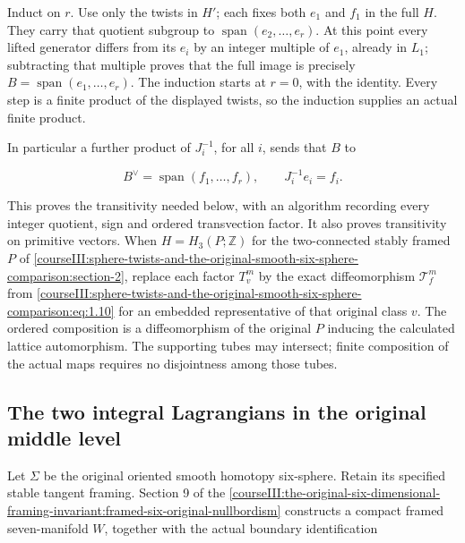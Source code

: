 Induct on \(r\). Use only the twists in \(H'\); each fixes both \(e_1\) and \(f_1\) in the full \(H\). They carry that quotient subgroup to \(\operatorname{span}(e_2,\ldots,e_r)\). At this point every lifted generator differs from its \(e_i\) by an integer multiple of \(e_1\), already in \(L_1\); subtracting that multiple proves that the full image is precisely \(B=\operatorname{span}(e_1,\ldots,e_r)\). The induction starts at \(r=0\), with the identity. Every step is a finite product of the displayed twists, so the induction supplies an actual finite product.

In particular a further product of \(J_i^{-1}\), for all \(i\), sends that \(B\) to

\begin{equation}
B^\vee=\operatorname{span}(f_1,\ldots,f_r),
             \qquad J_i^{-1}e_i=f_i.
 \label{courseIII:sphere-twists-and-the-original-smooth-six-sphere-comparison:eq:3.11}
\end{equation}

This proves the transitivity needed below, with an algorithm recording every integer quotient, sign and ordered transvection factor. It also proves transitivity on primitive vectors. When \(H=H_3(P;\mathbb Z)\) for the two-connected stably framed \(P\) of \cref{courseIII:sphere-twists-and-the-original-smooth-six-sphere-comparison:section-2}, replace each factor \(T_v^{m}\) by the exact diffeomorphism \(\mathcal T_f^{m}\) from \eqref{courseIII:sphere-twists-and-the-original-smooth-six-sphere-comparison:eq:1.10} for an embedded representative of that original class \(v\). The ordered composition is a diffeomorphism of the original \(P\) inducing the calculated lattice automorphism. The supporting tubes may intersect; finite composition of the actual maps requires no disjointness among those tubes.

\subsection{The two integral Lagrangians in the original middle level}
\label{courseIII:sphere-twists-and-the-original-smooth-six-sphere-comparison:twist-original-middle-level}

\label{courseIII:sphere-twists-and-the-original-smooth-six-sphere-comparison:section-4}

Let \(\Sigma\) be the original oriented smooth homotopy six-sphere. Retain its specified stable tangent framing. Section 9 of the \cref{courseIII:the-original-six-dimensional-framing-invariant:framed-six-original-nullbordism} constructs a compact framed seven-manifold \(W\), together with the actual boundary identification

